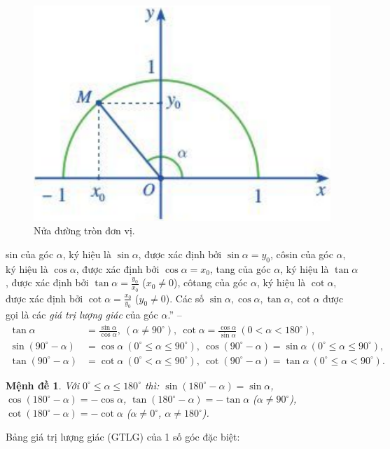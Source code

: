 \documentclass[oneside]{book}
\numberwithin{equation}{section}
\newtheorem{menhde}{Mệnh đề}[section]
\begin{document}
\begin{figure}[H]
	\centering
	\includegraphics[scale=0.2]{nua_duong_tron_don_vi_2}
	\caption{Nửa đường tròn đơn vị.}
	\label{fig:nua duong tron don vi 2}
\end{figure}
sin của góc $\alpha$, ký hiệu là $\sin\alpha$, được xác định bởi $\sin\alpha = y_0$, côsin của góc $\alpha$, ký hiệu là $\cos\alpha$, được xác định bởi $\cos\alpha = x_0$, tang của góc $\alpha$, ký hiệu là $\tan\alpha$, được xác định bởi $\tan\alpha = \frac{y_0}{x_0}$ ($x_0\ne 0$), côtang của góc $\alpha$, ký hiệu là $\cot\alpha$, được xác định bởi $\cot\alpha = \frac{x_0}{y_0}$ ($y_0\ne 0$). Các số $\sin\alpha,\cos\alpha,\tan\alpha,\cot\alpha$ được gọi là các \textit{giá trị lượng giác} của góc $\alpha$.'' -- \cite[pp. 63--64]{SGK_Toan_10_Canh_Dieu_tap_1}
\begin{align*}
	\tan\alpha &= \frac{\sin\alpha}{\cos\alpha},\ (\alpha\ne 90^\circ),\ \cot\alpha = \frac{\cos\alpha}{\sin\alpha}\ (0 < \alpha < 180^\circ),\\
	\sin(90^\circ - \alpha) &= \cos\alpha\ (0^\circ\le\alpha\le 90^\circ),\ \cos(90^\circ - \alpha) = \sin\alpha\ (0^\circ\le\alpha\le 90^\circ),\\
	\tan(90^\circ - \alpha) &= \cot\alpha\ (0^\circ < \alpha\le 90^\circ),\ \cot(90^\circ - \alpha) = \tan\alpha\ (0^\circ\le\alpha < 90^\circ).
\end{align*}

\begin{menhde}
	Với $0^\circ\le\alpha\le 180^\circ$ thì: $\sin(180^\circ - \alpha) = \sin\alpha$, $\cos(180^\circ - \alpha) = -\cos\alpha$, $\tan(180^\circ - \alpha) = -\tan\alpha$ ($\alpha\ne 90^\circ$), $\cot(180^\circ - \alpha) = -\cot\alpha$ ($\alpha\ne 0^\circ$, $\alpha\ne 180^\circ$).
\end{menhde}
Bảng giá trị lượng giác (GTLG) của 1 số góc đặc biệt:
\end{document}
